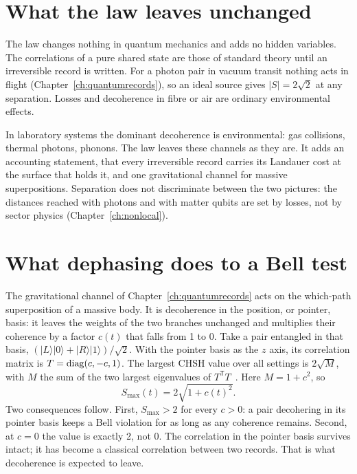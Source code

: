 \section{What the law leaves unchanged}\label{sec:ent:unchanged}
The law changes nothing in quantum mechanics and adds no hidden variables. The correlations of a pure shared state are those of standard theory until
an irreversible record is written. For a photon pair in vacuum transit nothing acts in flight (Chapter~\ref{ch:quantumrecords}), so an ideal source
gives $|S|=2\sqrt2$ at any separation. Losses and decoherence in fibre or air are ordinary environmental effects. \derived

In laboratory systems the dominant decoherence is environmental: gas collisions, thermal photons, phonons. The law leaves these channels as they are.
It adds an accounting statement, that every irreversible record carries its Landauer cost at the surface that holds it, and one gravitational channel
for massive superpositions. \interp{} Separation does not discriminate between the two pictures: the distances reached with photons and with matter qubits are
set by losses, not by sector physics (Chapter~\ref{ch:nonlocal}). \observed

\section{What dephasing does to a Bell test}\label{sec:ent:dephasing}
The gravitational channel of Chapter~\ref{ch:quantumrecords} acts on the which-path superposition of a massive body. It is decoherence in the position, or
pointer, basis: it leaves the weights of the two branches unchanged and multiplies their coherence by a factor $c(t)$ that falls from 1 to 0.
Take a pair entangled in that basis, $(|L\rangle|0\rangle+|R\rangle|1\rangle)/\sqrt2$. With the pointer basis as the $z$ axis, its correlation matrix
is $T={\rm diag}(c,-c,1)$. The largest CHSH value over all settings is $2\sqrt{M}$, with $M$ the sum of the two largest eigenvalues of
$T^{\mathsf T}T$~\cite{Horodecki1995}. Here $M=1+c^2$, so
\begin{equation}
S_{\max}(t)=2\sqrt{1+c(t)^2}.\label{eq:ent:smax}
\end{equation}
\derived{} Two consequences follow. First, $S_{\max}>2$ for every $c>0$: a pair decohering in its pointer basis keeps a Bell violation for as long as
any coherence remains. Second, at $c=0$ the value is exactly 2, not 0. The correlation in the pointer basis survives intact; it has become a classical
correlation between two records. That is what decoherence is expected to leave.

